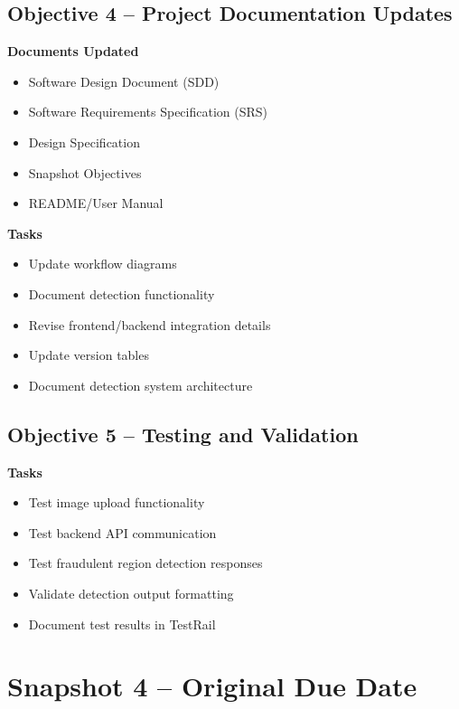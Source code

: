 \documentclass[12pt]{article}
\begin{document}
\subsection{Objective 4 -- Project Documentation Updates}

\textbf{Documents Updated}

\begin{itemize}
    \item Software Design Document (SDD)
    \item Software Requirements Specification (SRS)
    \item Design Specification
    \item Snapshot Objectives
    \item README/User Manual
\end{itemize}

\textbf{Tasks}

\begin{itemize}
    \item Update workflow diagrams
    \item Document detection functionality
    \item Revise frontend/backend integration details
    \item Update version tables
    \item Document detection system architecture
\end{itemize}

\subsection{Objective 5 -- Testing and Validation}

\textbf{Tasks}

\begin{itemize}
    \item Test image upload functionality
    \item Test backend API communication
    \item Test fraudulent region detection responses
    \item Validate detection output formatting
    \item Document test results in TestRail
\end{itemize}

\newpage

\section{Snapshot 4 -- Original Due Date}
\end{document}
